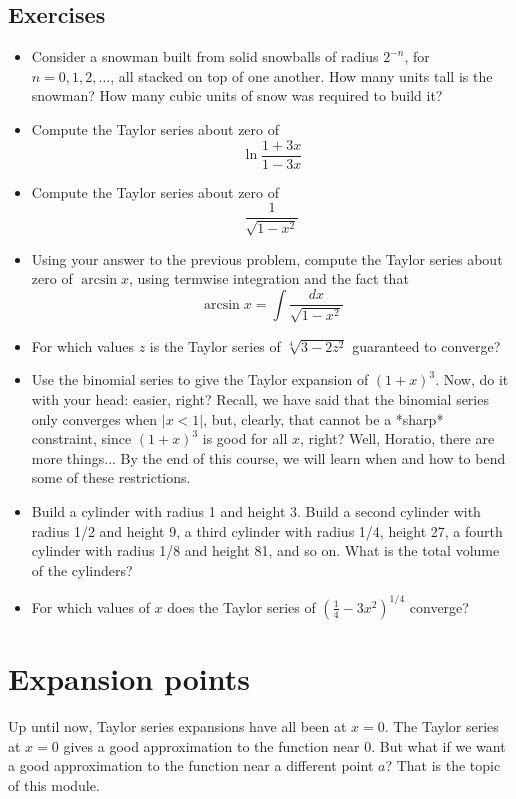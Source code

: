 \documentclass[a4paper]{book}
\begin{document}
\begin{sloppypar}
\subsection{Exercises}
\begin{itemize}
\item Consider a snowman built from solid snowballs of radius $2^{-n}$, for $n=0,1,2,\ldots $, all stacked on top of one another. How many units tall is the snowman? How many cubic units of snow was required to build it?
\item Compute the Taylor series about zero of \[ \ln\frac{1+3x}{1-3x} \]
\item Compute the Taylor series about zero of \[ \frac{1}{\sqrt{1-x^2}} \]
\item Using your answer to the previous problem, compute the Taylor series about zero of $\arcsin x$, using termwise integration and the fact that \[ \arcsin x = \int \frac{dx}{\sqrt{1-x^2}} \]
\item For which values $z$ is the Taylor series of $\sqrt[4]{3-2z^2}$ guaranteed to converge?
\item Use the binomial series to give the Taylor expansion of $(1+x)^3$. Now, do it with your head: easier, right? Recall, we have said that the binomial series only converges when $|x<1|$, but, clearly, that cannot be a *sharp* constraint, since $(1+x)^3$ is good for all $x$, right? Well, Horatio, there are more things... By the end of this course, we will learn when and how to bend some of these restrictions.
\item Build a cylinder with radius 1 and height 3. Build a second cylinder with radius 1/2 and height 9, a third cylinder with radius 1/4, height 27, a fourth cylinder with radius 1/8 and height 81, and so on. What is the total volume of the cylinders?
\item For which values of $x$ does the Taylor series of $(\frac{1}{4}-3x^2)^{1/4}$ converge?
\end{itemize}

\section{Expansion points} \label{ChFunctionsSecExpansionPoints}
Up until now, Taylor series expansions have all been at $x=0$. The Taylor series at $x=0$ gives a good approximation to the function near 0. But what if we want a good approximation to the function near a different point $a$? That is the topic of this module.

\end{sloppypar}
\end{document}
